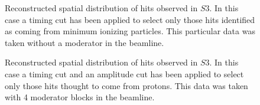 \begin{figure}[t]
  \begin{minipage}[t]{0.49\textwidth}
    \centering
    \begin{adjustbox}{max totalsize={\textwidth}{.5\textheight},center}
      
    \end{adjustbox}
    \caption{Reconstructed spatial distribution of hits observed in $\mathit{S3}$. In this case a timing cut has been applied to select only those hits identified as coming from minimum ionizing particles. This particular data was taken without a moderator in the beamline.}
    \label{fig:s3XY_pion}
  \end{minipage} 	
  \hfill
  \begin{minipage}[t]{0.49\textwidth}
    \centering
    \begin{adjustbox}{max totalsize={\textwidth}{.5\textheight},center}
      
    \end{adjustbox}
    \caption{Reconstructed spatial distribution of hits observed in $\mathit{S3}$. In this case a timing cut and an amplitude cut has been applied to select only those hits thought to come from protons. This data was taken with 4 moderator blocks in the beamline.}
    \label{fig:s3XY_proton}
  \end{minipage}
\end{figure}


